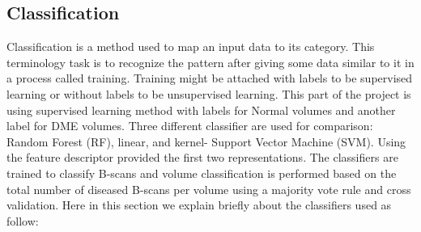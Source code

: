 \subsection{Classification}
Classification is a method used to map an input data to its category.
This terminology task is to recognize the pattern after giving some data similar to it in a process called training.
Training might be attached with labels to be supervised learning or without labels to be unsupervised learning.
This part of the project is using supervised learning method with labels for Normal volumes and another label for DME volumes.
Three different classifier are used for comparison: Random Forest (RF), linear, and kernel- Support Vector Machine (SVM).
Using the feature descriptor provided the first two representations.
The classifiers are trained to classify B-scans and volume classification is performed based on the total number of diseased B-scans per volume using a majority vote rule and cross validation.
Here in this section we explain briefly about the classifiers used as follow:
